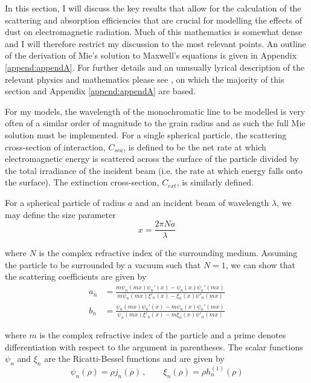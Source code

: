 In this section, I will discuss the key results that allow for the calculation of the scattering and absorption efficiencies that are crucial for modelling the effects of dust on electromagnetic radiation.  Much of this mathematics is somewhat dense and I will therefore restrict my discussion to the most relevant points. An outline of the derivation of  Mie's solution to Maxwell's equations is given in Appendix \ref{append:appendA}.  For further details and an unusually lyrical description of the relevant physics and mathematics please see \citet{Bohren1983}, on which the majority of this section and Appendix \ref{append:appendA} are based.  

For my models, the wavelength of the monochromatic line to be modelled is very often of a similar order of magnitude to the grain radius and as such the full Mie solution must be implemented.  %
For a single spherical particle, the scattering cross-section of interaction, $C_{sca}$, is defined to be the net rate at which electromagnetic energy is scattered across the surface of the particle divided by the total irradiance of the incident beam (i.e. the rate at which energy falls onto the surface).  The extinction cross-section, $C_{ext}$, is similarly defined.  

For a spherical particle of radius $a$ and an incident beam of wavelength $\lambda$, we may define the size parameter
\begin{equation}
x=\frac{2\pi N a}{\lambda}
\end{equation}

\noindent where $N$ is the complex refractive index of the surrounding medium.  Assuming the particle to be surrounded by a vacuum such that $N=1$, we can show that the scattering coefficients are given by 
\begin{align}
a_n &= \frac{m\psi_n(mx)\psi_n'(x)-\psi_n(x)\psi_n'(mx)}{m\psi_n(mx)\xi'_n(x)-\xi_n(x)\psi'_n(mx)} \\[2ex]
b_n &= \frac{\psi_n(mx)\psi_n'(x)-m\psi_n(x)\psi_n'(mx)}{\psi_n(mx)\xi'_n(x)-m\xi_n(x)\psi'_n(mx)}
\end{align}


\noindent where $m$ is the complex refractive index of the particle and a prime denotes differentiation with respect to the argument in parentheses. The scalar functions $\psi_n$ and $\xi_n$ are the Ricatti-Bessel functions and are given by
\begin{equation}
\psi_n(\rho) = \rho j_n(\rho) \, , \quad \quad \xi_n(\rho)=\rho h_n^{(1)}(\rho)
\end{equation}

